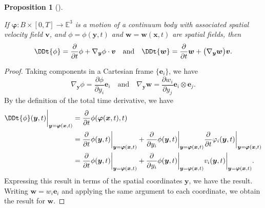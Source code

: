 \documentclass[
  letterpaper,
  DIV=11,
  numbers=noendperiod]{scrreprt}
\theoremstyle{plain}
\newtheorem{proposition}{Proposition}[chapter]
\theoremstyle{remark}
\begin{document}
\begin{proposition}[]\protect\hypertarget{prp-totaltimederiv}{}\label{prp-totaltimederiv}

If \({\boldsymbol{\varphi}}:B\times[0,T]\to{\mathbb{E}}^3\) is a motion
of a continuum body with associated spatial velocity field
\({\boldsymbol{v}}\), and \(\phi=\phi({\boldsymbol{y}},t)\) and
\({\boldsymbol{w}}={\boldsymbol{w}}({\boldsymbol{x}},t)\) are spatial
fields, then
\[\DDt{\phi} = \frac{\partial}{\partial t} \phi + \nabla_{\boldsymbol{y}}\phi\cdot {\boldsymbol{v}}\quad\text{and}\quad
    \DDt{{\boldsymbol{w}}} = \frac{\partial}{\partial t} {\boldsymbol{w}}+ \big(\nabla_{\boldsymbol{y}}{\boldsymbol{w}}\big) {\boldsymbol{v}}.\]

\end{proposition}

\begin{proof}
Taking components in a Cartesian frame \(\{{\boldsymbol{e}}_i\}\), we
have
\[\nabla_{\boldsymbol{y}}\phi = \frac{\partial \phi}{\partial y_i}{\boldsymbol{e}}_i\quad\text{and}\quad
    \nabla_{\boldsymbol{y}}{\boldsymbol{w}}= \frac{\partial w_i}{\partial y_j}{\boldsymbol{e}}_i\otimes{\boldsymbol{e}}_j.\]
By the definition of the total time derivative, we have
\[\begin{aligned}
      \DDt{\phi}({\boldsymbol{y}},t)\bigg|_{{\boldsymbol{y}}= {\boldsymbol{\varphi}}({\boldsymbol{x}},t)}
      &= \frac{\partial}{\partial t} \phi({\boldsymbol{\varphi}}({\boldsymbol{x}},t),t)\\
      &= \frac{\partial}{\partial t} \phi({\boldsymbol{y}},t)\bigg|_{{\boldsymbol{y}}= {\boldsymbol{\varphi}}({\boldsymbol{x}},t)}+
      \frac{\partial}{\partial y_i} \phi({\boldsymbol{y}},t)\bigg|_{{\boldsymbol{y}}= {\boldsymbol{\varphi}}({\boldsymbol{x}},t)}\frac{\partial}{\partial t}\varphi_i({\boldsymbol{y}},t)\bigg|_{{\boldsymbol{y}}= {\boldsymbol{\varphi}}({\boldsymbol{x}},t)}\\
      &= \frac{\partial}{\partial t} \phi({\boldsymbol{y}},t)\bigg|_{{\boldsymbol{y}}= {\boldsymbol{\varphi}}({\boldsymbol{x}},t)}+
      \frac{\partial}{\partial y_i} \phi({\boldsymbol{y}},t)\bigg|_{{\boldsymbol{y}}= {\boldsymbol{\varphi}}({\boldsymbol{x}},t)}v_i({\boldsymbol{y}},t)\bigg|_{{\boldsymbol{y}}= {\boldsymbol{\varphi}}({\boldsymbol{x}},t)}.
    \end{aligned}\] Expressing this result in terms of the spatial
coordinates \({\boldsymbol{y}}\), we have the result. Writing
\({\boldsymbol{w}}=w_i{\boldsymbol{e}}_i\) and applying the same
argument to each coordinate, we obtain the result for
\({\boldsymbol{w}}\).
\end{proof}
\end{document}
